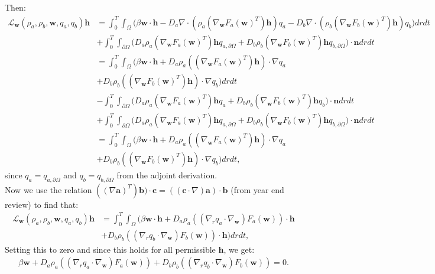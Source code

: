 \documentclass[11pt, a4paper]{article}
\theoremstyle{definition}
\newcommand{\adja}{q_a}
\newcommand{\adjb}{q_b}
\newcommand{\adjaB}{q_{a,\partial \Omega}}
\newcommand{\adjbB}{q_{b,\partial \Omega}}
\newcommand{\ra}{\rho_a}
\newcommand{\rb}{\rho_b}
\newcommand{\w}{\mathbf{w}}
\newcommand{\n}{\mathbf{n}}
\newcommand{\h}{\mathbf{h}}
\begin{document}
    Then:
	\begin{align*}
	\mathcal{L}_{\w}(\ra,\rb, \w, \adja, \adjb) \h  &= \int_0^T \int_\Omega \bigg( \beta \w \cdot \h - D_a \nabla \cdot (\ra \left(\nabla_{\w} F_a(\w)^T\right) \h)  \adja - D_b \nabla \cdot (\rb \left(\nabla_{\w} F_b(\w)^T \right)\h) \adjb \bigg)dr dt \\
	&+ \int_0^T \int_{\partial \Omega} \bigg( D_a \ra \left(\nabla_{\w} F_a(\w)^T\right) \h \adjaB   + D_b \rb \left(\nabla_{\w} F_b(\w)^T\right) \h\adjbB     \bigg) \cdot \n dr dt\\
	&= \int_0^T \int_\Omega \bigg( \beta \w \cdot \h + D_a \ra \left(\left(\nabla_{\w} F_a(\w)^T\right) \h \right)\cdot\nabla  \adja \\
	&+ D_b \rb \left(\left(\nabla_{\w} F_b(\w)^T\right) \h \right)\cdot \nabla \adjb  \bigg)dr dt \\
	&- \int_0^T \int_{\partial \Omega} \bigg( D_a \ra \left(\nabla_{\w} F_a(\w)^T\right) \h \adja   + D_b \rb \left(\nabla_{\w} F_b(\w)^T\right) \h\adjb     \bigg) \cdot \n dr dt\\
	&+ \int_0^T \int_{\partial \Omega} \bigg( D_a \ra \left(\nabla_{\w} F_a(\w)^T\right) \h \adjaB   + D_b \rb \left(\nabla_{\w} F_b(\w)^T\right) \h\adjbB     \bigg) \cdot \n dr dt\\
	&=\int_0^T \int_\Omega \bigg( \beta \w \cdot \h + D_a \ra \left(\left(\nabla_{\w} F_a(\w)^T\right) \h \right)\cdot\nabla  \adja \\
	&+ D_b \rb \left(\left(\nabla_{\w} F_b(\w)^T\right) \h \right)\cdot \nabla \adjb  \bigg)dr dt,
	\end{align*}
	since $\adja = \adjaB$ and $\adjb = \adjbB$ from the adjoint derivation.\\
	Now we use the relation $((\nabla \mathbf a)^T)\mathbf b) \cdot \mathbf c= (( \mathbf c \cdot \nabla) \mathbf a ) \cdot \mathbf b$ (from year end review) to find that:
	\begin{align*}
	\mathcal{L}_{\w}(\ra,\rb, \w, \adja, \adjb) \h  &= \int_0^T \int_\Omega \bigg( \beta \w \cdot \h + D_a \ra \left( \left(\nabla_r \adja \cdot \nabla_{\w} \right) F_a(\w) \right) \cdot \h         \\
	&+ D_b \rb \left( \left(\nabla_r \adjb \cdot \nabla_{\w} \right) F_b(\w) \right) \cdot \h       \bigg)dr dt,
	\end{align*}
	Setting this to zero and since this holds for all permissible $\h$, we get:
	\begin{align*}
	\beta \w  + D_a \ra \left( \left(\nabla_r \adja \cdot \nabla_{\w} \right) F_a(\w) \right) 
	+ D_b \rb \left( \left(\nabla_r \adjb \cdot \nabla_{\w} \right) F_b(\w) \right) = 0.
	\end{align*} 
\end{document}
